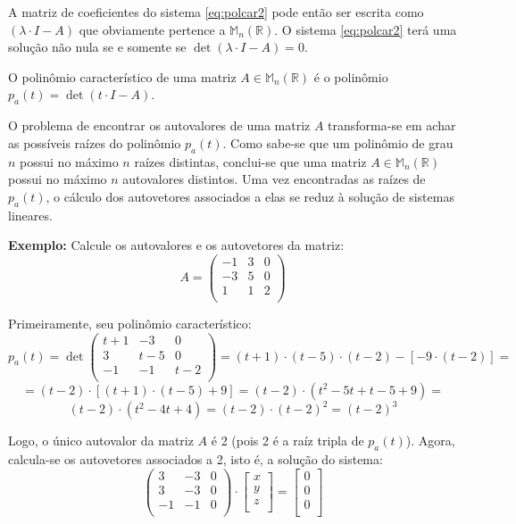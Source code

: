 A matriz de coeficientes do sistema \eqref{eq:polcar2} pode então ser escrita como $(\lambda\cdot I-A)$ que obviamente pertence a $\mathbb{M}_n(\mathbb{R})$. O sistema \eqref{eq:polcar2} terá uma solução não nula se e somente se $\det(\lambda\cdot I-A)=0$.

O polinômio característico de uma matriz $A\in\mathbb{M}_n(\mathbb{R})$ é o polinômio $p_a(t)=\det(t\cdot I-A)$.

O problema de encontrar os autovalores de uma matriz $A$ transforma-se em achar as possíveis raízes do polinômio $p_a(t)$. Como sabe-se que um polinômio de grau $n$ possui no máximo $n$ raízes distintas, conclui-se que uma matriz $A\in\mathbb{M}_n(\mathbb{R})$ possui no máximo $n$ autovalores distintos. Uma vez encontradas as raízes de $p_a(t)$, o cálculo dos autovetores associados a elas se reduz à solução de sistemas lineares.

\textbf{Exemplo:} Calcule os autovalores e os autovetores da matriz:
$$A=\begin{pmatrix}-1 & 3 & 0\\-3 & 5 & 0\\1 & 1 & 2\\ \end{pmatrix}$$

Primeiramente, seu polinômio característico:
$$p_a(t)=\det\begin{pmatrix}t+1 & -3 & 0\\3 & t-5 & 0\\-1 & -1 & t-2\\ \end{pmatrix}=(t+1)\cdot(t-5)\cdot(t-2)-[-9\cdot(t-2)]=$$
$$=(t-2)\cdot[(t+1)\cdot(t-5)+9]=(t-2)\cdot(t^2-5t+t-5+9)=$$
$$(t-2)\cdot(t^2-4t+4)=(t-2)\cdot{(t-2)}^2={(t-2)}^3$$

Logo, o único autovalor da matriz $A$ é 2 (pois 2 é a raíz tripla de $p_a(t)$). Agora, calcula-se os autovetores associados a 2, isto é, a solução do sistema:
$$\begin{pmatrix}3 & -3 & 0\\3 & -3 & 0\\-1 & -1 & 0\\ \end{pmatrix}\cdot\begin{bmatrix}x\\y\\z\\ \end{bmatrix}=\begin{bmatrix}0\\0\\0\\ \end{bmatrix}$$

